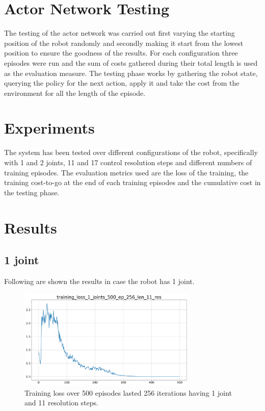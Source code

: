 \documentclass[twocolumn, a4paper]{article}
\begin{document}
\section{Actor Network Testing}
The testing of the actor network was carried out first varying the starting
position of the robot randomly and secondly making it start from the lowest
position to ensure the goodness of the results.
For each configuration three episodes were run and the sum of costs gathered
during their total length is used as the evaluation measure.
The testing phase works by gathering the robot state, querying the policy
for the next action, apply it and take the cost from the environment for all
the length of the episode.

\section{Experiments}
The system has been tested over different configurations of the robot,
specifically with 1 and 2 joints, 11 and 17 control resolution steps and
different numbers of training episodes.
The evaluation metrics used are the loss of the training, the training
cost-to-go at the end of each training episodes and the cumulative cost in the
testing phase.

\section{Results}
\subsection{1 joint}
Following are shown the results in case the robot has 1 joint.

\begin{figure}[H]
	\centering
	\includegraphics[width=8.5cm]{"../Figures/training_loss_1J_500E_256EL_11RES.png"}
	\caption{Training loss over 500 episodes lasted 256 iterations having 1
			 joint and 11 resolution steps.}
	\label{fig:TrainLoss_1_500_11}
\end{figure}
\end{document}
